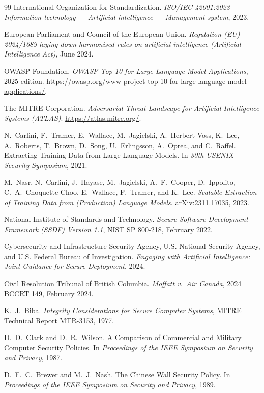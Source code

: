 \documentclass[11pt]{article}
\begin{document}
\begin{thebibliography}{99}
International Organization for Standardization.
\emph{ISO/IEC 42001:2023 --- Information technology --- Artificial
intelligence --- Management system}, 2023.

European Parliament and Council of the European Union.
\emph{Regulation (EU) 2024/1689 laying down harmonised rules on
artificial intelligence (Artificial Intelligence Act)}, June 2024.

OWASP Foundation.
\emph{OWASP Top 10 for Large Language Model Applications}, 2025
edition.
\url{https://owasp.org/www-project-top-10-for-large-language-model-applications/}.

The MITRE Corporation.
\emph{Adversarial Threat Landscape for Artificial-Intelligence Systems
(ATLAS)}.
\url{https://atlas.mitre.org/}.

N.~Carlini, F.~Tramer, E.~Wallace, M.~Jagielski, A.~Herbert-Voss,
K.~Lee, A.~Roberts, T.~Brown, D.~Song, U.~Erlingsson, A.~Oprea, and
C.~Raffel.
Extracting Training Data from Large Language Models.
In \emph{30th USENIX Security Symposium}, 2021.

M.~Nasr, N.~Carlini, J.~Hayase, M.~Jagielski, A.~F.~Cooper, D.~Ippolito,
C.~A.~Choquette-Choo, E.~Wallace, F.~Tramer, and K.~Lee.
\emph{Scalable Extraction of Training Data from (Production) Language
Models}.
arXiv:2311.17035, 2023.

National Institute of Standards and Technology.
\emph{Secure Software Development Framework (SSDF) Version 1.1},
NIST SP 800-218, February 2022.

Cybersecurity and Infrastructure Security Agency, U.S. National
Security Agency, and U.S. Federal Bureau of Investigation.
\emph{Engaging with Artificial Intelligence: Joint Guidance for Secure
Deployment}, 2024.

Civil Resolution Tribunal of British Columbia.
\emph{Moffatt v.\ Air Canada}, 2024 BCCRT 149, February 2024.

K.~J.~Biba.
\emph{Integrity Considerations for Secure Computer Systems}, MITRE
Technical Report MTR-3153, 1977.

D.~D.~Clark and D.~R.~Wilson.
A Comparison of Commercial and Military Computer Security Policies.
In \emph{Proceedings of the IEEE Symposium on Security and Privacy},
1987.

D.~F.~C.~Brewer and M.~J.~Nash.
The Chinese Wall Security Policy.
In \emph{Proceedings of the IEEE Symposium on Security and Privacy},
1989.


\end{thebibliography}
\end{document}
